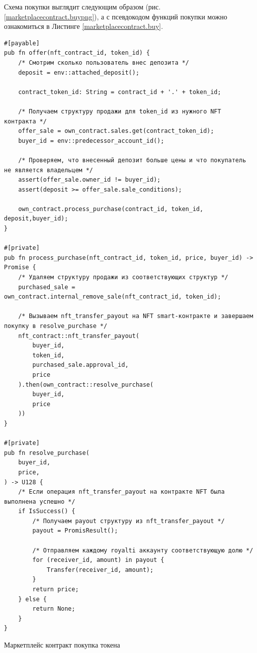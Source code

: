 Схема покупки выглядит следующим образом (рис. {\color{blue}\ref{marketplacecontract.buypng}}), а с псевдокодом функций покупки можно ознакомиться в Листинге {\color{blue}\ref{marketplacecontract.buy}}.

\begin{listing}
\begin{verbatim}
#[payable]
pub fn offer(nft_contract_id, token_id) {
    /* Смотрим сколько пользователь внес депозита */
    deposit = env::attached_deposit();

    contract_token_id: String = contract_id + '.' + token_id;

    /* Получаем структуру продажи для token_id из нужного NFT контракта */
    offer_sale = own_contract.sales.get(contract_token_id);
    buyer_id = env::predecessor_account_id();

    /* Проверяем, что внесенный депозит больше цены и что покупатель не является владельцем */
    assert(offer_sale.owner_id != buyer_id);
    assert(deposit >= offer_sale.sale_conditions);

    own_contract.process_purchase(contract_id, token_id, deposit,buyer_id);
}

#[private]
pub fn process_purchase(nft_contract_id, token_id, price, buyer_id) -> Promise {
    /* Удаляем структуру продажи из соответствующих структур */
    purchased_sale = own_contract.internal_remove_sale(nft_contract_id, token_id);

    /* Вызываем nft_transfer_payout на NFT smart-контракте и завершаем покупку в resolve_purchase */
    nft_contract::nft_transfer_payout(
        buyer_id,
        token_id,
        purchased_sale.approval_id,
        price
    ).then(own_contract::resolve_purchase(
        buyer_id,
        price
    ))
}

#[private]
pub fn resolve_purchase(
    buyer_id,
    price,
) -> U128 {
    /* Если операция nft_transfer_payout на контракте NFT была выполнена успешно */
    if IsSuccess() {
        /* Получаем payout структуру из nft_transfer_payout */
        payout = PromisResult();

        /* Отправляем каждому royalti аккаунту соответствующую долю */
        for (receiver_id, amount) in payout {
            Transfer(receiver_id, amount);
        }
        return price;
    } else {
        return None;
    }
}
\end{verbatim}
\caption{Маркетплейс контракт покупка токена}
\label{marketplacecontract.buy}
\end{listing}

